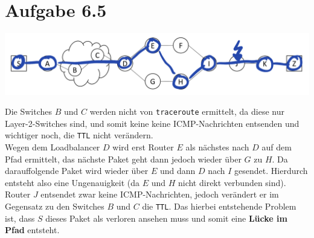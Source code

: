 \documentclass[12pt, a4paper]{article}
\begin{document}
\section*{Aufgabe 6.5}
\includegraphics[scale=0.5]{6.5.png}

Die Switches $B$ und $C$ werden nicht von \verb|traceroute| ermittelt, da diese nur Layer-2-Switches sind, und somit keine keine ICMP-Nachrichten entsenden und wichtiger noch, die \verb|TTL| nicht verändern.\\
Wegen dem Loadbalancer $D$ wird erst Router $E$ als nächstes nach $D$ auf dem Pfad ermittelt, das nächste Paket geht dann jedoch wieder über $G$ zu $H$. Da darauffolgende Paket wird wieder über $E$ und dann $D$ nach $I$ gesendet. Hierdurch entsteht also eine Ungenauigkeit (da $E$ und $H$ nicht direkt verbunden sind).\\
Router $J$ entsendet zwar keine ICMP-Nachrichten, jedoch verändert er im Gegensatz zu den Switches $B$ und $C$ die \verb|TTL|. Das hierbei entstehende Problem ist, dass $S$ dieses Paket als verloren ansehen muss und somit eine \textbf{Lücke im Pfad} entsteht.
\end{document}

